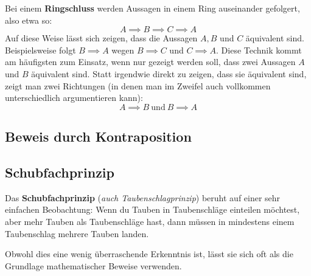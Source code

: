 \documentclass[../../main.tex]{subfiles}
\begin{document}
    Bei einem \textbf{Ringschluss} werden Aussagen in einem Ring auseinander gefolgert, also etwa so:
    \[A\implies B\implies C\implies A\]
    Auf diese Weise lässt sich zeigen, dass die Aussagen $A,B$ und $C$ äquivalent sind. Beispielsweise folgt $B\implies A$ wegen $B\implies C$ und $C\implies A$. Diese Technik kommt am häufigsten zum Einsatz, wenn nur gezeigt werden soll, dass zwei Aussagen $A$ und $B$ äquivalent sind. Statt irgendwie direkt zu zeigen, dass sie äquivalent sind, zeigt man zwei Richtungen (in denen man im Zweifel auch vollkommen unterschiedlich argumentieren kann):
    \[A\implies B~\text{und}~B\implies A\]
    \begin{advexample}{}
        
    \end{advexample}

    \subsection*{Beweis durch Kontraposition}
    \subsection*{Schubfachprinzip}
    Das \textbf{Schubfachprinzip} (\emph{auch Taubenschlagprinzip}) beruht auf einer sehr einfachen Beobachtung: Wenn du Tauben in Taubenschläge einteilen möchtest, aber mehr Tauben als Taubenschläge hast, dann müssen in mindestens einem Taubenschlag mehrere Tauben landen.
    
    Obwohl dies eine wenig überraschende Erkenntnis ist, lässt sie sich oft als die Grundlage mathematischer Beweise verwenden.
    
\end{document}
